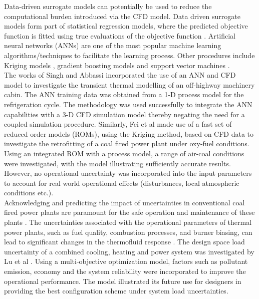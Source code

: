 \documentclass[a4paper,fleqn]{cas-sc}
\begin{document}
Data-driven surrogate models can potentially be used to reduce the computational burden introduced via the CFD model. Data driven surrogate models form part of statistical regression models, where the predicted objective function is fitted using true evaluations of the objective function \cite{Wheeler2019}. Artificial neural networks (ANNs) are one of the most popular machine learning algorithms/techniques to facilitate the learning process. Other procedures include Kriging models \cite{Fei2015}, gradient boosting models \cite{Si2020,Qin2022} and support vector machines \cite{Lv2017}.\\

The works of Singh and Abbassi \cite{Singh2018} incorporated the use of an ANN and CFD model to investigate the transient thermal modelling of an off-highway machinery cabin. The ANN training data was obtained from a 1-D process model for the refrigeration cycle. The methodology was used successfully to integrate the ANN capabilities with a 3-D CFD simulation model thereby negating the need for a coupled simulation procedure. Similarly, Fei et al \cite{Fei2015} made use of a fast set of reduced order models (ROMs), using the Kriging method, based on CFD data to investigate the retrofitting of a coal fired power plant under oxy-fuel conditions. Using an integrated ROM with a process model, a range of air-coal conditions were investigated, with the model illustrating sufficiently accurate results. However, no operational uncertainty was incorporated into the input parameters to account for real world operational effects (disturbances, local atmospheric conditions etc.).\\

Acknowledging and predicting the impact of uncertainties in conventional coal fired power plants are paramount for the safe operation and maintenance of these plants \cite{Madejski_18}. The uncertainties associated with the operational parameters of thermal power plants, such as fuel quality, combustion processes, and  burner biasing, can lead to significant changes in the thermofluid response \cite{Sarkar2015}. The design space load uncertainty of a combined cooling, heating and power system was investigated by Lu et al \cite{Lu2021}. Using a multi-objective optimization model, factors such as pollutant emission, economy and the system reliability were incorporated to improve the operational performance. The model illustrated its future use for designers in providing the best configuration scheme under system load uncertainties.\\ 
\end{document}
